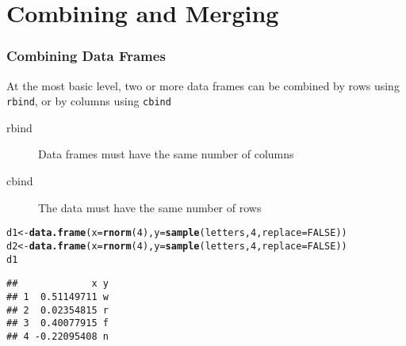 \documentclass[paper=screen,mathserif]{beamer}\usepackage[]{graphicx}\usepackage[]{color}
\makeatletter
\newcommand{\hlnum}[1]{\textcolor[rgb]{0.686,0.059,0.569}{#1}}%
\newcommand{\hlstd}[1]{\textcolor[rgb]{0.345,0.345,0.345}{#1}}%
\newcommand{\hlkwb}[1]{\textcolor[rgb]{0.69,0.353,0.396}{#1}}%
\newcommand{\hlkwc}[1]{\textcolor[rgb]{0.333,0.667,0.333}{#1}}%
\newcommand{\hlkwd}[1]{\textcolor[rgb]{0.737,0.353,0.396}{\textbf{#1}}}%
\newenvironment{kframe}{%
 \def\at@end@of@kframe{}%
 \ifinner\ifhmode%
  \def\at@end@of@kframe{\end{minipage}}%
  \begin{minipage}{\columnwidth}%
 \fi\fi%
 \def\FrameCommand##1{\hskip\@totalleftmargin \hskip-\fboxsep
 \colorbox{shadecolor}{##1}\hskip-\fboxsep
     \hskip-\linewidth \hskip-\@totalleftmargin \hskip\columnwidth}%
 \MakeFramed {\advance\hsize-\width
   \@totalleftmargin\z@ \linewidth\hsize
   \@setminipage}}%
 {\par\unskip\endMakeFramed%
 \at@end@of@kframe}
\newenvironment{knitrout}{}{} %
\newcommand{\ft}[1]{\frametitle{#1}}
\makeatother
\begin{document}
\section{Combining and Merging}

\begin{frame}[fragile]
  \ft{Combining Data Frames}
  
  At the most basic level, two or more data frames can be combined by
  rows using \verb=rbind=, or by columns using \verb=cbind=
  \begin{description}
  \item[rbind] Data frames must have the same number of columns
  \item[cbind] The data must have the same number of rows
  \end{description} 
\begin{knitrout}\scriptsize
{}\color{fgcolor}\begin{kframe}
\begin{alltt}
\hlstd{d1} \hlkwb{<-} \hlkwd{data.frame}\hlstd{(}\hlkwc{x} \hlstd{=} \hlkwd{rnorm}\hlstd{(}\hlnum{4}\hlstd{),} \hlkwc{y} \hlstd{=} \hlkwd{sample}\hlstd{(letters,} \hlnum{4}\hlstd{,} \hlkwc{replace} \hlstd{=} \hlnum{FALSE}\hlstd{))}
\hlstd{d2} \hlkwb{<-} \hlkwd{data.frame}\hlstd{(}\hlkwc{x} \hlstd{=} \hlkwd{rnorm}\hlstd{(}\hlnum{4}\hlstd{),} \hlkwc{y} \hlstd{=} \hlkwd{sample}\hlstd{(letters,} \hlnum{4}\hlstd{,} \hlkwc{replace} \hlstd{=} \hlnum{FALSE}\hlstd{))}
\hlstd{d1}
\end{alltt}
\begin{verbatim}
##             x y
## 1  0.51149711 w
## 2  0.02354815 r
## 3  0.40077915 f
## 4 -0.22095408 n
\end{verbatim}
\end{kframe}
\end{knitrout}

\end{frame}
\end{document}

